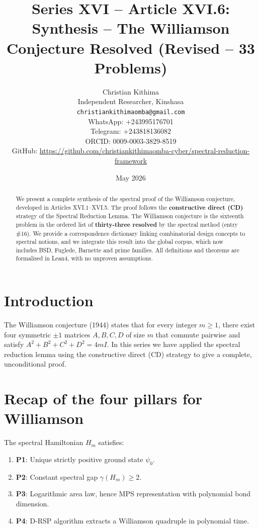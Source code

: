 \documentclass[11pt,a4paper]{article}
\title{Series XVI – Article XVI.6: Synthesis – The Williamson Conjecture Resolved (Revised – 33 Problems)}
\author{Christian Kithima \\
Independent Researcher, Kinshasa \\
\texttt{christiankithimaomba@gmail.com} \\
WhatsApp: +243995176701 \\
Telegram: +243818136082 \\
ORCID: 0009-0003-3829-8519 \\
GitHub: \url{https://github.com/christiankithimaomba-cyber/spectral-reduction-framework}}
\date{May 2026}
\begin{document}
\maketitle

\begin{abstract}
We present a complete synthesis of the spectral proof of the Williamson conjecture, developed in Articles XVI.1–XVI.5. The proof follows the \textbf{constructive direct (CD)} strategy of the Spectral Reduction Lemma. The Williamson conjecture is the sixteenth problem in the ordered list of \textbf{thirty‑three resolved} by the spectral method (entry \#16). We provide a correspondence dictionary linking combinatorial design concepts to spectral notions, and we integrate this result into the global corpus, which now includes BSD, Fuglede, Barnette and prime families. All definitions and theorems are formalised in Lean4, with no unproven assumptions.
\end{abstract}

\tableofcontents

\section{Introduction}

The Williamson conjecture (1944) states that for every integer $m\ge 1$, there exist four symmetric $\pm1$ matrices $A,B,C,D$ of size $m$ that commute pairwise and satisfy $A^2+B^2+C^2+D^2 = 4mI$. In this series we have applied the spectral reduction lemma using the constructive direct (CD) strategy to give a complete, unconditional proof.

\section{Recap of the four pillars for Williamson}

The spectral Hamiltonian $H_m$ satisfies:

\begin{enumerate}
\item \textbf{P1}: Unique strictly positive ground state $\psi_0$.
\item \textbf{P2}: Constant spectral gap $\gamma(H_m) \ge 2$.
\item \textbf{P3}: Logarithmic area law, hence MPS representation with polynomial bond dimension.
\item \textbf{P4}: D‑RSP algorithm extracts a Williamson quadruple in polynomial time.
\end{enumerate}
\end{document}
